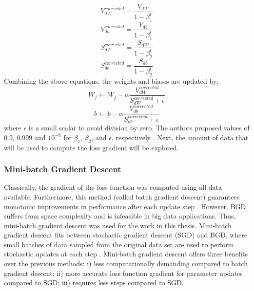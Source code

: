 \begin{equation}
    V_{dW}^{corrected} = \frac{V_{dW}}{1 - \beta_1^t}
\end{equation}
\begin{equation}
    V_{db}^{corrected} = \frac{V_{db}}{1 - \beta_1^t}
\end{equation}
\begin{equation}
    S_{dW}^{corrected} = \frac{S_{dW}}{1 - \beta_2^t}
\end{equation}
\begin{equation}
    S_{db}^{corrected} = \frac{S_{db}}{1 - \beta_2^t}
\end{equation}
Combining the above equations, the weights and biases are updated by:
\begin{equation}
    W_j \leftarrow W_j - \alpha \frac{V_{dW}^{corrected}}{S_{dW}^{corrected} + \epsilon}
\end{equation}
\begin{equation}
    b \leftarrow b - \alpha \frac{V_{db}^{corrected}}{S_{db}^{corrected} + \epsilon}
\end{equation}
where $\epsilon$ is a small scalar to avoid division by zero. The authors proposed values of 0.9, 0.999 and $10^{-8}$ for $\beta_1$, $\beta_2$, and $\epsilon$, respectively \cite{ADAM}.  Next, the amount of data that will be used to compute the loss gradient will be explored.

\subsubsection{Mini-batch Gradient Descent}
Classically, the gradient of the loss function was computed using all data available. Furthermore, this method (called batch gradient descent) guarantees monotonic improvements in performance after each update step \cite{deeplearning_course}. However, BGD suffers from space complexity and is infeasible in big data applications.  Thus, mini-batch gradient descent was used for the work in this thesis. Mini-batch gradient descent fits between stochastic gradient descent (SGD) and BGD, where small batches of data sampled from the original data set are used to perform stochastic updates at each step \cite{sgd}. Mini-batch gradient descent offers three benefits over the previous methods: i) less computationally demanding compared to batch gradient descent; ii) more accurate loss function gradient for parameter updates compared to SGD; iii) requires less steps compared to SGD.



